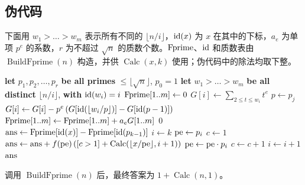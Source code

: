 \subsection{伪代码}

下面用 $w_1>\dots>w_m$ 表示所有不同的 $\lfloor n/i\rfloor$，$\pvar{id}(x)$ 为 $x$ 在其中的下标，$a_e$ 为单项 $p^e$ 的系数，$r$ 为不超过 $\sqrt n$ 的质数个数。$\pvar{Fprime}$、$\pvar{id}$ 和质数表由 $\operatorname{BuildFprime}(n)$ 构造，并供 $\operatorname{Calc}(x,k)$ 使用；伪代码中的除法均取下整。

\begin{algorithm}[H]
    \caption{Min\_25 筛}
    \begin{algorithmic}[1]
            \State \textbf{let} $p_1,p_2,\dots,p_r$ \textbf{be all primes} $\le\lfloor\sqrt n\rfloor$, $p_0=1$
            \State \textbf{let} $w_1>\dots>w_m$ \textbf{be all distinct} $\lfloor n/i\rfloor$, \textbf{with} $\pvar{id}(w_i)=i$
            \State $\pvar{Fprime}[1..m] \gets 0$
                    \State $G[i] \gets \sum_{2\le t\le w_i} t^e$
                \EndFor
                    \State $p \gets p_j$
                        \State $G[i] \gets G[i]-p^e\left(G[\pvar{id}(\lfloor w_i/p\rfloor)]-G[\pvar{id}(p-1)]\right)$
                    \EndFor
                \EndFor
                \State $\pvar{Fprime}[1..m] \gets \pvar{Fprime}[1..m]+a_e G[1..m]$
            \EndFor
        \EndProcedure
                \State \Return $0$
            \EndIf
            \State $\pvar{ans} \gets \pvar{Fprime}[\pvar{id}(x)]-\pvar{Fprime}[\pvar{id}(p_{k-1})]$
            \State $i \gets k$
                \State $\pvar{pe} \gets p_i$
                \State $c \gets 1$
                    \State $\pvar{ans} \gets \pvar{ans} + f(\pvar{pe})\left([c>1]+\operatorname{Calc}(\lfloor x/\pvar{pe}\rfloor,i+1)\right)$
                    \State $\pvar{pe} \gets \pvar{pe}\cdot p_i$
                    \State $c \gets c+1$
                \EndWhile
                \State $i \gets i+1$
            \EndWhile
            \State \Return $\pvar{ans}$
        \EndProcedure
    \end{algorithmic}
\end{algorithm}

调用 $\operatorname{BuildFprime}(n)$ 后，最终答案为 $1+\operatorname{Calc}(n,1)$。
